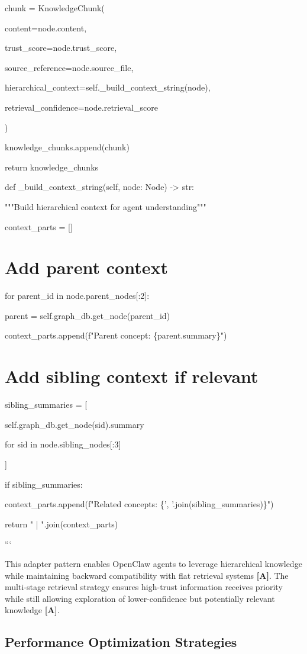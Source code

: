 \documentclass[a4paper,11pt]{article}
\newcommand{\alabel}{\textbf{\textcolor{acolor}{[A]}}}
\begin{document}
chunk = KnowledgeChunk(

content=node.content,

trust\_score=node.trust\_score,

source\_reference=node.source\_file,

hierarchical\_context=self.\_build\_context\_string(node),

retrieval\_confidence=node.retrieval\_score

)

knowledge\_chunks.append(chunk)


return knowledge\_chunks


def \_build\_context\_string(self, node: Node) -> str:

"""Build hierarchical context for agent understanding"""

context\_parts = []


\section{Add parent context}
for parent\_id in node.parent\_nodes[:2]:

parent = self.graph\_db.get\_node(parent\_id)

context\_parts.append(f"Parent concept: \{parent.summary\}")


\section{Add sibling context if relevant}
sibling\_summaries = [

self.graph\_db.get\_node(sid).summary

for sid in node.sibling\_nodes[:3]

]

if sibling\_summaries:

context\_parts.append(f"Related concepts: \{', '.join(sibling\_summaries)\}")


return " | ".join(context\_parts)

```


This adapter pattern enables OpenClaw agents to leverage hierarchical knowledge while maintaining backward compatibility with flat retrieval systems \alabel{}. The multi-stage retrieval strategy ensures high-trust information receives priority while still allowing exploration of lower-confidence but potentially relevant knowledge \alabel{}.


\subsection{Performance Optimization Strategies}
\end{document}
